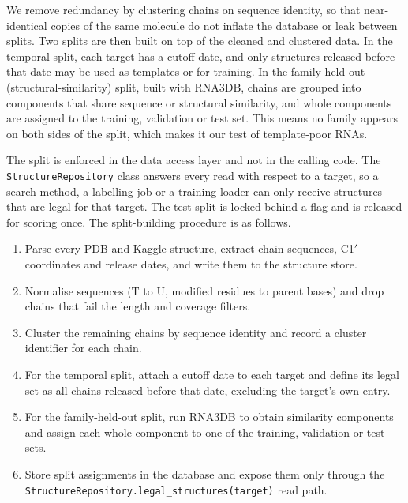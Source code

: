 \documentclass{FastFyp}
\begin{document}
We remove redundancy by clustering chains on sequence identity, so that near-identical copies of the same molecule do not inflate the database or leak between splits. Two splits are then built on top of the cleaned and clustered data. In the temporal split, each target has a cutoff date, and only structures released before that date may be used as templates or for training. In the family-held-out (structural-similarity) split, built with RNA3DB, chains are grouped into components that share sequence or structural similarity, and whole components are assigned to the training, validation or test set. This means no family appears on both sides of the split, which makes it our test of template-poor RNAs.

The split is enforced in the data access layer and not in the calling code. The \texttt{StructureRepository} class answers every read with respect to a target, so a search method, a labelling job or a training loader can only receive structures that are legal for that target. The test split is locked behind a flag and is released for scoring once. The split-building procedure is as follows.

\begin{enumerate}
\item Parse every PDB and Kaggle structure, extract chain sequences, C1$'$ coordinates and release dates, and write them to the structure store.
\item Normalise sequences (T to U, modified residues to parent bases) and drop chains that fail the length and coverage filters.
\item Cluster the remaining chains by sequence identity and record a cluster identifier for each chain.
\item For the temporal split, attach a cutoff date to each target and define its legal set as all chains released before that date, excluding the target's own entry.
\item For the family-held-out split, run RNA3DB to obtain similarity components and assign each whole component to one of the training, validation or test sets.
\item Store split assignments in the database and expose them only through the \texttt{StructureRepository.legal\_structures(target)} read path.
\end{enumerate}
\end{document}
